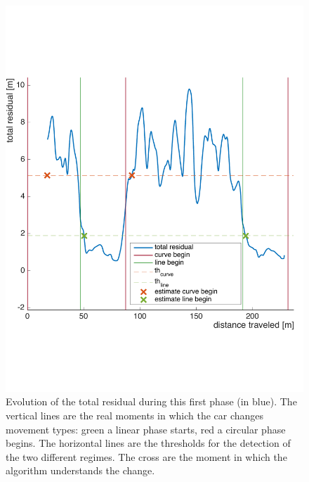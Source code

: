 \begin{figure}[!htbp]
    \centering
    \includegraphics[width=1.0\textwidth]{img/following_platform_for_long_position_base_error.pdf}
    \caption{Evolution of the total residual during this first phase (in blue). The vertical lines are the real moments in which the car changes movement types: green a linear phase starts, red a circular phase begins. The horizontal lines are the thresholds for the detection of the two different regimes. The cross are the moment in which the algorithm understands the change.}
    \label{fig:error_regression}
\end{figure}

